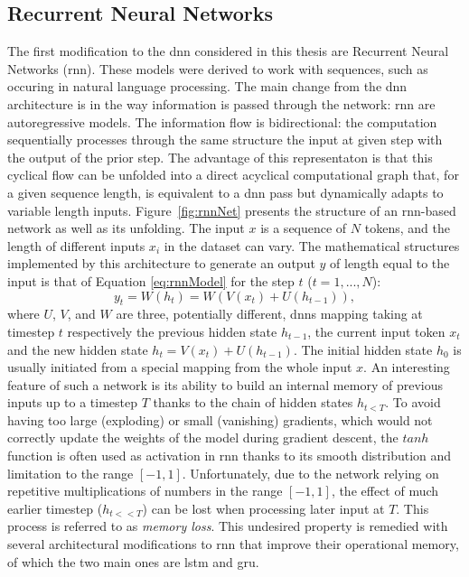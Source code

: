 \subsection{Recurrent Neural Networks}\label{sec:RNN}
The first modification to the \gls{dnn} considered in this thesis are Recurrent Neural Networks (\gls{rnn}). These models were derived to work with sequences, such as occuring in natural language processing. The main change from the \gls{dnn} architecture is in the way information is passed through the network: \gls{rnn} are autoregressive models. The information flow is bidirectional: the computation sequentially processes through the same structure the input at given step with the output of the prior step. The advantage of this representaton is that this cyclical flow can be unfolded into a direct acyclical computational graph that, for a given sequence length, is equivalent to a \gls{dnn} pass but dynamically adapts to variable length inputs. Figure~\ref{fig:rnnNet} presents the structure of an \gls{rnn}-based network as well as its unfolding. The input $x$ is a sequence of $N$ tokens, and the length of different inputs $x_i$ in the dataset can vary. The mathematical structures implemented by this architecture to generate an output $y$ of length equal to the input is that of Equation \ref{eq:rnnModel} for the step $t$ ($t=1, ..., N$):
\begin{equation}\label{eq:rnnModel}
    y_t = W(h_t) = W(V(x_t) + U(h_{t-1})),
\end{equation}
where $U$, $V$, and $W$ are three, potentially different, \gls{dnn}s mapping taking at timestep $t$ respectively the previous hidden state $h_{t-1}$, the current input token $x_t$ and the new hidden state $h_t = V(x_t) + U(h_{t-1})$. The initial hidden state $h_0$ is usually initiated from a special mapping from the whole input $x$. An interesting feature of such a network is its ability to build an internal memory of previous inputs up to a timestep $T$ thanks to the chain of hidden states $h_{t<T}$. To avoid having too large (exploding) or small (vanishing) gradients, which would not correctly update the weights of the model during gradient descent, the $tanh$ function is often used as activation in \gls{rnn} thanks to its smooth distribution and limitation to the range $[-1, 1]$. Unfortunately, due to the network relying on repetitive multiplications of numbers in the range $[-1, 1]$, the effect of much earlier timestep ($h_{t<<T}$) can be lost when processing later input at $T$. This process is referred to as \textit{memory loss}. This undesired property is remedied with several  architectural modifications to \gls{rnn} that improve their operational memory, of which the two main ones are \gls{lstm} and \gls{gru}.

